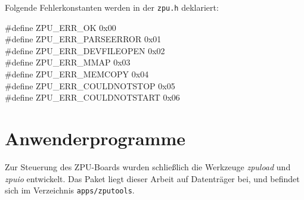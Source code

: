 \documentclass[11pt]{scrartcl}
\begin{document}
Folgende Fehlerkonstanten werden in der \texttt{zpu.h} deklariert:
\begin{description}
    \item[\#define ZPU\_ERR\_OK              0x00]
    
    \item[\#define ZPU\_ERR\_PARSEERROR      0x01]
    
    \item[\#define ZPU\_ERR\_DEVFILEOPEN     0x02]
    
    \item[\#define ZPU\_ERR\_MMAP            0x03]
    
    \item[\#define ZPU\_ERR\_MEMCOPY         0x04]
    
    \item[\#define ZPU\_ERR\_COULDNOTSTOP    0x05]
    
    \item[\#define ZPU\_ERR\_COULDNOTSTART   0x06]
    
\end{description}







\pagebreak
\section{Anwenderprogramme}

Zur Steuerung des ZPU-Boards wurden schließlich die Werkzeuge \emph{zpuload}   und \emph{zpuio} entwickelt. Das Paket liegt dieser Arbeit auf Datenträger bei, und befindet sich im Verzeichnis \texttt{apps/zputools}.
\end{document}
